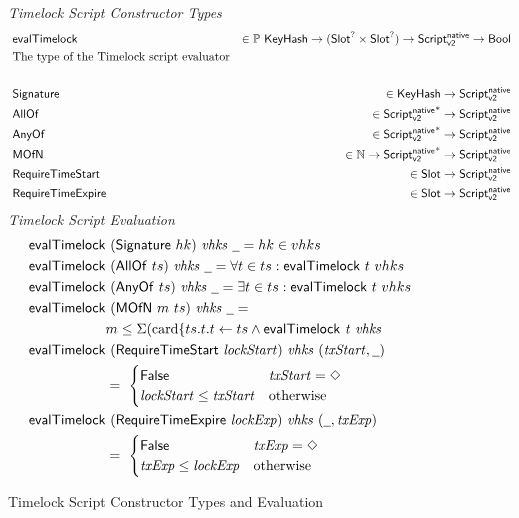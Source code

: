 \begin{figure*}[htb]
  \emph{Timelock Script Constructor Types}
  \begin{align*}
    & \mathsf{evalTimelock} & \in \mathbb{P}~\mathsf{KeyHash}\to(\mathsf{Slot}^? \times \mathsf{Slot}^?)\to\mathsf{Script^{native}_{v2}} \to \mathsf{Bool} & \\
    & \text{The type of the Timelock script evaluator} \\~\\
    & \mathsf{Signature} & \in \mathsf{KeyHash} \to \mathsf{Script^{native}_{v2}} & \\
    & \mathsf{AllOf} & \in \mathsf{Script^{native}_{v2}}^{*} \to \mathsf{Script^{native}_{v2}} & \\
    & \mathsf{AnyOf} & \in \mathsf{Script^{native}_{v2}}^{*} \to \mathsf{Script^{native}_{v2}} & \\
    & \mathsf{MOfN} & \in \mathbb{N} \to \mathsf{Script^{native}_{v2}}^{*} \to \mathsf{Script^{native}_{v2}} & \\
    & \mathsf{RequireTimeStart} & \in \mathsf{Slot} \to \mathsf{Script^{native}_{v2}} &\\
    & \mathsf{RequireTimeExpire} & \in \mathsf{Slot} \to \mathsf{Script^{native}_{v2}} &\\
  \end{align*}
  \emph{Timelock Script Evaluation}
  \begin{align*}
    \fun{evalTimelock} & ~(\type{Signature}~hk)~\var{vhks}~\wcard =  hk \in vhks \\
    \fun{evalTimelock} & ~(\type{AllOf}~ts)~\var{vhks}~\wcard =
                              \forall t \in ts: \fun{evalTimelock}~t~vhks\\
    \fun{evalTimelock} & ~(\type{AnyOf}~ts)~\var{vhks}~\wcard =
                              \exists t \in ts: \fun{evalTimelock}~t~vhks\\
    \fun{evalTimelock} & ~(\type{MOfN}~m~ts)~\var{vhks}~\wcard = \\
                             & m \leq \Sigma
                               (\textrm{card} \{ t s.t. t \leftarrow ts \wedge \fun{evalTimelock}~\var{t}~\var{vhks} \\
    \fun{evalTimelock} &~(\type{RequireTimeStart}~\var{lockStart})~\var{vhks}~\var{(\var{txStart}, \wcard)} \\
    & =~
    \begin{cases}
      \False & \var{txStart} = \Nothing \\
      \var{lockStart} \leq \var{txStart} & \text{otherwise}
    \end{cases} \\
    \fun{evalTimelock} &~(\type{RequireTimeExpire}~\var{lockExp})~\var{vhks}~\var{(\wcard, \var{txExp})} \\
    & =~
    \begin{cases}
      \False & \var{txExp} = \Nothing \\
      \var{txExp} \leq \var{lockExp} & \text{otherwise}
    \end{cases} \\
  \end{align*}
  \caption{Timelock Script Constructor Types and Evaluation}
  \label{fig:defs:tx-mc-eval}
\end{figure*}

